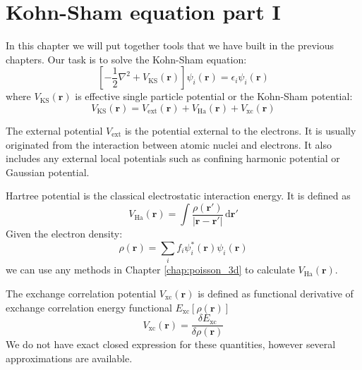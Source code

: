 \chapter{Kohn-Sham equation part I}

In this chapter we will put together tools that we have built in the previous chapters.
Our task is to solve the Kohn-Sham equation:
\begin{equation}
\left[ -\frac{1}{2}\nabla^2 + V_{\mathrm{KS}}(\mathbf{r}) \right]
\psi_{i}(\mathbf{r}) = \epsilon_{i} \psi_{i}(\mathbf{r})
\end{equation}
where $V_{\mathrm{KS}}(\mathbf{r})$ is effective single
particle potential or
the Kohn-Sham potential:
\begin{equation}
V_{\mathrm{KS}}(\mathbf{r}) =
V_{\mathrm{ext}}(\mathbf{r}) + V_{\mathrm{Ha}}(\mathbf{r}) + V_{\mathrm{xc}}(\mathbf{r})
\label{eq:KS_pot_local}
\end{equation}

The external potential $V_{\mathrm{ext}}$ is the potential external to the
electrons. It is usually originated from the interaction between atomic nuclei
and electrons. It also includes any external local potentials such as
confining harmonic potential or Gaussian potential.

Hartree potential is the classical electrostatic interaction energy. It is defined as
\begin{equation}
V_{\mathrm{Ha}}(\mathbf{r}) = \int \frac{\rho(\mathbf{r}')}{\left| \mathbf{r} - \mathbf{r}' \right|}
\,\mathrm{d}\mathbf{r}'
\end{equation}
Given the electron density:
\begin{equation}
\rho(\mathbf{r}) = \sum_{i} f_{i} \psi_{i}^{*}(\mathbf{r}) \psi_{i}(\mathbf{r})
\label{eq:elec_dens_01}
\end{equation}
we can use any methods in Chapter \ref{chap:poisson_3d} to calculate
$V_{\mathrm{Ha}}(\mathbf{r})$.

The exchange correlation potential $V_{\mathrm{xc}}(\mathbf{r})$
is defined as functional derivative of
exchange correlation energy functional $E_{\mathrm{xc}}[\rho(\mathbf{r})]$
\begin{equation}
V_{\mathrm{xc}}(\mathbf{r}) = \frac{\delta E_{\mathrm{xc}}}{\delta \rho(\mathbf{r})}
\end{equation}
We do not have exact closed expression for these quantities, however several
approximations are available.

